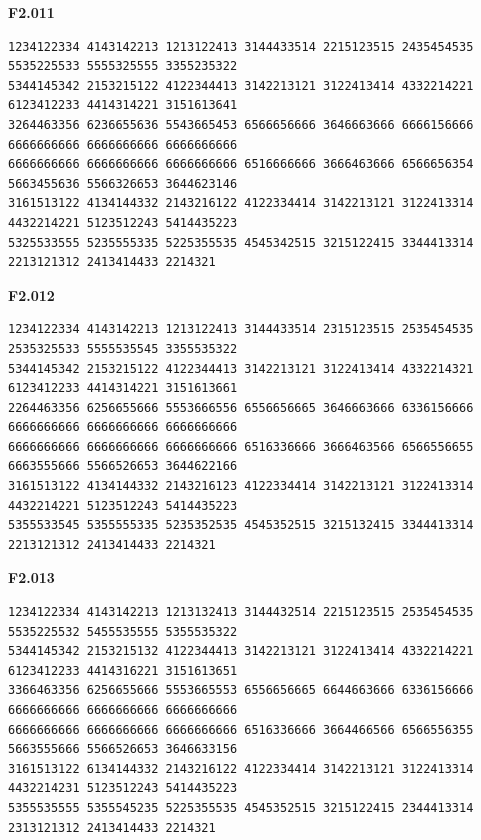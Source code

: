 \noindent\begin{minipage}{\linewidth}\textbf{F2.011}
\begin{lstlisting}
1234122334 4143142213 1213122413 3144433514 2215123515 2435454535 5535225533 5555325555 3355235322
5344145342 2153215122 4122344413 3142213121 3122413414 4332214221 6123412233 4414314221 3151613641
3264463356 6236655636 5543665453 6566656666 3646663666 6666156666 6666666666 6666666666 6666666666
6666666666 6666666666 6666666666 6516666666 3666463666 6566656354 5663455636 5566326653 3644623146
3161513122 4134144332 2143216122 4122334414 3142213121 3122413314 4432214221 5123512243 5414435223
5325533555 5235555335 5225355535 4545342515 3215122415 3344413314 2213121312 2413414433 2214321
\end{lstlisting}
\end{minipage}\par\smallskip

\noindent\begin{minipage}{\linewidth}\textbf{F2.012}
\begin{lstlisting}
1234122334 4143142213 1213122413 3144433514 2315123515 2535454535 2535325533 5555535545 3355535322
5344145342 2153215122 4122344413 3142213121 3122413414 4332214321 6123412233 4414314221 3151613661
2264463356 6256655666 5553666556 6556656665 3646663666 6336156666 6666666666 6666666666 6666666666
6666666666 6666666666 6666666666 6516336666 3666463566 6566556655 6663555666 5566526653 3644622166
3161513122 4134144332 2143216123 4122334414 3142213121 3122413314 4432214221 5123512243 5414435223
5355533545 5355555335 5235352535 4545352515 3215132415 3344413314 2213121312 2413414433 2214321
\end{lstlisting}
\end{minipage}\par\smallskip

\noindent\begin{minipage}{\linewidth}\textbf{F2.013}
\begin{lstlisting}
1234122334 4143142213 1213132413 3144432514 2215123515 2535454535 5535225532 5455535555 5355535322
5344145342 2153215132 4122344413 3142213121 3122413414 4332214221 6123412233 4414316221 3151613651
3366463356 6256655666 5553665553 6556656665 6644663666 6336156666 6666666666 6666666666 6666666666
6666666666 6666666666 6666666666 6516336666 3664466566 6566556355 5663555666 5566526653 3646633156
3161513122 6134144332 2143216122 4122334414 3142213121 3122413314 4432214231 5123512243 5414435223
5355535555 5355545235 5225355535 4545352515 3215122415 2344413314 2313121312 2413414433 2214321
\end{lstlisting}
\end{minipage}\par\smallskip

